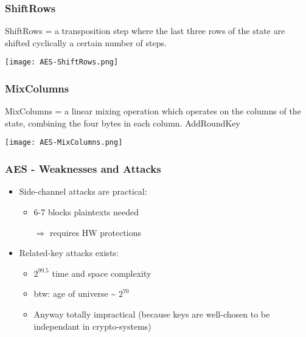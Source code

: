 \documentclass[
hyperref={pdfpagelabels=false}
,xcolor=table
]
{beamer}
\begin{document}
\begin{frame}
  \frametitle{ShiftRows}
  ShiftRows = a transposition step where the last three rows of the state are shifted cyclically a certain number of steps.  


  \begin{center}
    \texttt{[image: AES-ShiftRows.png]}
  \end{center}
 
\end{frame}


\begin{frame}
  \frametitle{MixColumns}
  MixColumns = a
      linear mixing operation which operates on the columns of the
      state, combining the four bytes in each column.
      AddRoundKey


  \begin{center}
    \texttt{[image: AES-MixColumns.png]}
  \end{center}
 
\end{frame}

\begin{frame}
  \frametitle{AES - Weaknesses and Attacks}

  \begin{itemize}
  \item Side-channel attacks are practical:
    \begin{itemize}
    \item 6-7 blocks plaintexts needed
    \item[$\Rightarrow$] requires HW protections
    \end{itemize}
  \item Related-key attacks exists:
    \begin{itemize}
    \item $2^{99.5}$ time and space complexity
    \item btw: age of universe \~{} $2^{70}$
    \item Anyway totally impractical (because keys are well-chosen to
      be independant in crypto-systems)
    \end{itemize}
  \end{itemize}
  \end{frame}
\end{document}
